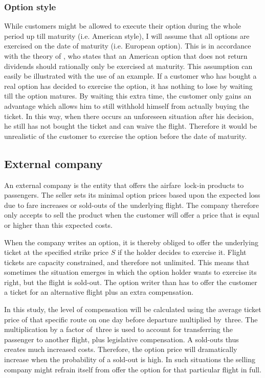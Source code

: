 \subsubsection{Option style}
\label{sec:OptionStyle}
While customers might be allowed to execute their option during the whole period up till maturity (i.e. American style), I will assume that all options are exercised on the date of maturity (i.e. European option). This is in accordance with the theory of , who states that an American option that does not return dividends should rationally only be exercised at maturity. This assumption can easily be illustrated with the use of an example. If a customer who has bought a real option has decided to exercise the option, it has nothing to lose by waiting till the option matures. By waiting this extra time, the customer only gains an advantage which allows him to still withhold himself from actually buying the ticket. In this way, when there occurs an unforeseen situation after his decision, he still has not bought the ticket and can waive the flight. Therefore it would be unrealistic of the customer to exercise the option before the date of maturity.


\subsection{External company}
An external company is the entity that offers the airfare~lock-in products to passengers. The seller sets its minimal option prices based upon the expected loss due to fare increases or sold-outs of the underlying flight. The company therefore only accepts to sell the product when the customer will offer a price that is equal or higher than this expected costs.

When the company writes an option, it is thereby obliged to offer the underlying ticket at the specified strike price $S$ if the holder decides to exercise it. Flight tickets are capacity constrained, and therefore not unlimited. This means that sometimes the situation emerges in which the option holder wants to exercise its right, but the flight is sold-out. The option writer than has to offer the customer a ticket for an alternative flight plus an extra compensation.

In this study, the level of compensation will be calculated using the average ticket price of that specific route on one day before departure multiplied by~three. The multiplication by a factor of~three is used to account for transferring the passenger to another flight, plus legislative compensation. A sold-outs thus creates much increased costs. Therefore, the option price will dramatically increase when the probability of a sold-out is high. In such situations the selling company might refrain itself from offer the option for that particular flight in full.

